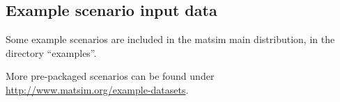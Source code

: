 \subsection{Example scenario input data}

Some example scenarios are included in the \gls{matsim} main distribution, in the directory ``examples''.

More pre-packaged scenarios can be found under \url{http://www.matsim.org/example-datasets}.

%
%
%
%
%
%
%
%
